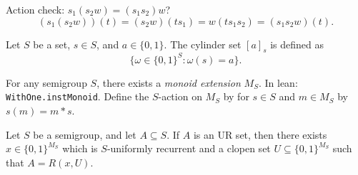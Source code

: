 Action check: $s_1(s_2w) = (s_1s_2)w$?
\[(s_1(s_2w))(t) = (s_2w)(ts_1) = w(ts_1s_2) = (s_1s_2 w)(t).\]

\begin{definition}
\label{def_cylinder_set}
\leanok{}
    Let $S$ be a set, $s \in S$, and $a \in \{0,1\}$. The cylinder set $[a]_s$ is defined as
    \[\{\omega \in \{0,1\}^{S} : \omega(s) = a\}.\]
\end{definition}

\begin{definition}
    For any semigroup $S$, there exists a \emph{monoid extension} $M_S$.  In lean: \verb|WithOne.instMonoid|.  Define the $S$-action on $M_S$ by for $s \in S$ and $m \in M_S$ by $s(m) = m * s$.
\end{definition}

\begin{lemma}
    \label{lemma_unif_rec_implies_UR}
    \leanok{}
    Let $S$ be a semigroup, and let $A \subseteq S$.  If $A$ is an UR set, then there exists $x \in \{0, 1\}^{M_S}$ which is $S$-uniformly recurrent and a clopen set $U \subseteq \{0,1\}^{M_S}$ such that $A = R(x,U)$.
\end{lemma}




